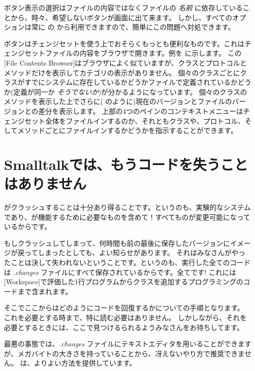 \documentclass[a4paper,10pt,twoside]{book}
\begin{document}
ボタン表示の選択はファイルの内容ではなくファイルの \emph{名前} に依存していることから、時々、希望しないボタンが画面に出て来ます。
しかし、すべてのオプションは常に \actclick の  から利用できますので、簡単にこの問題へ対処できます。

 ボタンはチェンジセットを使う上でおそらくもっとも便利なものです。これはチェンジセットファイルの内容をブラウザで開きます。例を  に示します。
この[File Contents Browser]はブラウザによく似ていますが、クラスとプロトコルとメソッドだけを表示してカテゴリの表示がありません。
個々のクラスごとにクラスがすでにシステムに存在しているかどうかファイルで定義されているかどうか(定義が同一か \emph{そうでないか})が分かるようになっています。
個々のクラスのメソッドを表示した上でさらに(  のように)現在のバージョンとファイルのバージョンとの差分を表示します。
上部の4つのペインのコンテキストメニューはチェンジセット全体をファイルインするのか、それともクラスや、プロトコル、そしてメソッドごとにファイルインするかどうかを指示することができます。

\section{Smalltalkでは、もうコードを失うことはありません}

\pharo がクラッシュすることは十分あり得ることです。というのも、実験的なシステムであり、\pharo が機能するために必要なものを含めて！すべてものが変更可能になっているからです。


もしクラッシュしてしまって、何時間も前の最後に保存したバージョンにイメージが戻ってしまったとしても、よい知らせがあります。
それはみなさんがやったことは決して失われないということです。というのも、実行した全てのコードは \emph{.changes} ファイルにすべて保存されているからです。全てです! 
これには[Workspace]で評価した1行プログラムからクラスを追加するプログラミングのコードまで含まれます。

そこでここからはどのようにコードを回復するかについての手順となります。
これを必要とする時まで、特に読む必要はありません。
しかしながら、それを必要とするときには、ここで見つけるられるようみなさんをお待ちしてます。

最悪の事態では、\emph{.changes} ファイルにテキストエディタを用いることができますが、メガバイトの大きさを持っていることから、冴えないやり方で推奨できません。
\pharo は、よりよい方法を提供しています。
\end{document}
